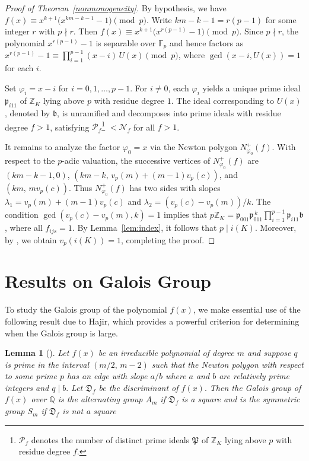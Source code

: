 \documentclass[table]{amsart}
\newtheorem{lemma}[theorem]{Lemma}
\newcommand{\Z}{\mathbb{Z}}
\newcommand{\Q}{\mathbb{Q}}
\newcommand{\D}{\mathfrak{D}}
\numberwithin{equation}{section}
\begin{document}
\begin{proof}[Proof of Theorem~\ref{nonmonogeneity}]
By hypothesis, we have 
$f(x)\equiv x^{k+1}\bigl(x^{km-k-1}-1\bigr)\pmod{p}$. 
Write $km-k-1=r(p-1)$ for some integer $r$ with $p\nmid r$. 
Then $f(x)\equiv x^{k+1}\bigl(x^{r(p-1)}-1\bigr)\pmod{p}$. 
Since $p\nmid r$, the polynomial $x^{r(p-1)}-1$ is separable over $\mathbb{F}_p$ and hence factors as 
$x^{r(p-1)}-1\equiv \prod_{i=1}^{p-1}(x-i)\,U(x)\pmod{p}$, where $\gcd(x-i,U(x))=1$ for each $i$.

Set $\varphi_i=x-i$ for $i=0,1,\ldots,p-1$. 
For $i\neq 0$, each $\varphi_i$ yields a unique prime ideal $\mathfrak{p}_{i11}$ of $\Z_K$ lying above $p$ with residue degree $1$. 
The ideal corresponding to $U(x)$, denoted by $\mathfrak{b}$, is unramified and decomposes into prime ideals with residue degree $f>1$, satisfying $\mathcal{P}_f$\footnote{ $\mathcal{P}_f$ denotes the number of distinct prime ideals $\mathfrak{P}$ of $\Z_K$ lying above $p$ with residue degree $f$.} $<\mathcal{N}_f$ for all $f>1$.

It remains to analyze the factor $\varphi_0=x$ via the Newton polygon $N^+_{\varphi_0}(f)$. 
With respect to the $p$-adic valuation, the successive vertices of $N^+_{\varphi_0}(f)$ are 
$(km-k-1,0)$, $(km-k,\,v_p(m)+(m-1)v_p(c))$, and $(km,\,mv_p(c))$. 
Thus $N^+_{\varphi_0}(f)$ has two sides with slopes 
$\lambda_1=v_p(m)+(m-1)v_p(c)$ and $\lambda_2=(v_p(c)-v_p(m))/k$. 
The condition $\gcd(v_p(c)-v_p(m),k)=1$ implies that
$p\Z_K=\mathfrak{p}_{001}\mathfrak{p}_{011}^{\,k}\prod_{i=1}^{p-1}\mathfrak{p}_{i11}\mathfrak{b}$,
where all $f_{ijs}=1$. By Lemma~\ref{lem:index}, it follows that $p\mid i(K)$. Moreover, by \cite[Corollary, p.~230 and Theorem~4]{Engstrom1930}, we obtain $v_p(i(K))=1$, completing the proof.
\end{proof}

\section{Results on Galois Group}
To study the Galois group of the polynomial \( f(x) \), we make essential use of the following result due to Hajir, which provides a powerful criterion for determining when the Galois group is large.
\begin{lemma}[{\cite[Theorem~2.2]{Hajir2005Laguerre}}]\label{hajir}
Let $f(x)$ be an irreducible polynomial of degree $m$ and suppose $q$ is prime in the interval $(m/2,\,m-2)$ such that the Newton polygon with respect to some prime $p$ has an edge with slope $a/b$ where $a$ and $b$ are relatively prime integers and $q \mid b.$ Let $\D_f$ be the discriminant of $f(x).$ Then the Galois group of $f(x)$ over $\Q$ is the alternating group $A_m$ if $\D_f$ is a square and is the symmetric group $S_m$ if $\D_f$ is not a square
\end{lemma}
\end{document}
